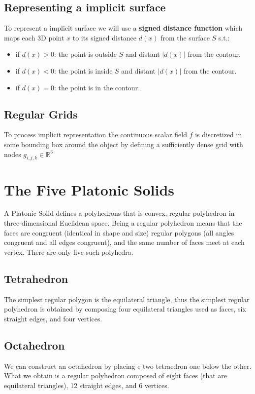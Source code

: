 \subsection{Representing a implicit surface}
To represent a implicit surface we will use a \textbf{signed distance function} which maps each 3D point $x$ to its signed distance $d(x)$ from the surface $S$ s.t.:
\begin{itemize}
    \item if $d(x) > 0$: the point is outside $S$ and distant $|d(x)|$ from the contour.
    \item if $d(x) < 0$: the point is inside $S$ and distant $|d(x)|$ from the contour.
    \item if $d(x) = 0$: the point is in the contour.
\end{itemize}

\subsection{Regular Grids}
To process implicit representation the continuous scalar field $f$ is discretized in some bounding box around the object by defining a sufficiently dense grid with nodes $g_{i,j,k} \in \mathbb{R}^{3}$

\section{The Five Platonic Solids}
A Platonic Solid defines a polyhedrons that is convex, regular polyhedron in three-dimensional Euclidean space. Being a regular polyhedron means that the faces are congruent (identical in shape and size) regular polygons (all angles congruent and all edges congruent), and the same number of faces meet at each vertex. There are only five such polyhedra.

\subsection{Tetrahedron}
The simplest regular polygon is the equilateral triangle, thus the simplest regular polyhedron is obtained by composing four equilateral triangles used as faces, six straight edges, and four vertices.


\subsection{Octahedron}
We can construct an octahedron by placing e two tetraedron one below the other. What we obtain is a regular polyhedron composed of eight faces (that are equilateral triangles), 12 straight edges, and 6 vertices.

